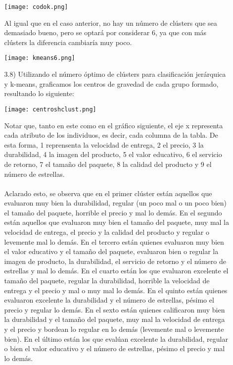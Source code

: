 \documentclass[11pt,a4paper]{report}
\begin{document}
\begin{itemize}
\begin{itemize}
\begin{center}
\texttt{[image: codok.png]}
\end{center}
Al igual que en el caso anterior, no hay un número de clústers que sea demasiado bueno, pero se optará por considerar 6, ya que con más clústers la diferencia cambiaría muy poco.\\
\begin{center}
\texttt{[image: kmeans6.png]}
\end{center}
\item[3.8)]
Utilizando el número óptimo de clústers para clasificación jerárquica y k-means, graficamos los centros de gravedad de cada grupo formado, resultando lo siguiente:
\begin{center}
\texttt{[image: centroshclust.png]}
\end{center}
Notar que, tanto en este como en el gráfico siguiente, el eje x representa cada atributo de los individuos, es decir, cada columna de la tabla. De esta forma, 1 reprensenta la velocidad de entrega, 2 el precio, 3 la durabilidad, 4 la imagen del producto, 5 el valor educativo, 6 el servicio de retorno, 7 el tamaño del paquete, 8 la calidad del producto y 9 el número de estrellas.\\
\\
Aclarado esto, se observa que en el primer clúster están aquellos que evaluaron muy bien la durabilidad, regular (un poco mal o un poco bien) el tamaño del paquete, horrible el precio y mal lo demás. En el segundo están aquellos que evaluaron muy bien el tamaño del paquete, muy mal la velocidad de entrega, el precio y la calidad del producto y regular o levemente mal lo demás. En el tercero están quienes evaluaron muy bien el valor educativo y el tamaño del paquete, evaluaron bien o regular la imagen de producto, la durabilidad, el servicio de retorno y el número de estrellas y mal lo demás. En el cuarto están los que evaluaron excelente el tamaño del paquete, regular la durabilidad, horrible la velocidad de entrega y el precio y mal o muy mal lo demás. En el quinto están quienes evaluaron excelente la durabilidad y el número de estrellas, pésimo el precio y regular lo demás. En el sexto están quienes calificaron muy bien la durabilidad y el tamaño del paquete, muy mal la velocidad de entrega y el precio y bordean lo regular en lo demás (levemente mal o levemente bien). En el último están los que evalúan excelente la durabilidad, regular o bien el valor educativo y el número de estrellas, pésimo el precio y mal lo demás.


\end{itemize}
\end{itemize}
\end{document}
